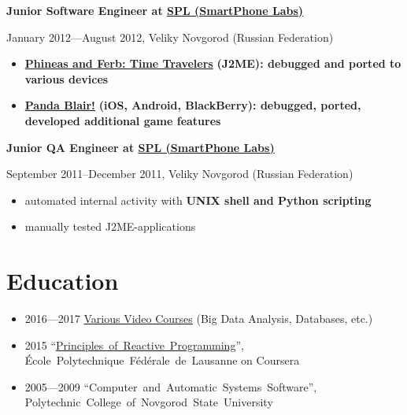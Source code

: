 \vspace{0.5cm}

{
\fontsize{12pt}{12pt}\selectfont
\bfseries Junior Software Engineer at
\href{http://spl.co}{\bfseries SPL (SmartPhone Labs)\mdseries}
\mdseries
}

{
\fontsize{9pt}{8pt}\selectfont
January 2012---August 2012, Veliky Novgorod (Russian Federation)
}

\begin{itemize}[rightmargin=\dimexpr\linewidth-18cm-\leftmargin\relax]
\item
    \href{http://java.mob.org/game/phineas\_and\_ferb\_time\_travelers.html}
        {\bfseries Phineas and Ferb: Time Travelers\mdseries}
        \bfseries (J2ME)\mdseries:
        debugged and ported to various devices
\item
    \href{https://itunes.apple.com/us/app/panda-blair!/id500995558?mt=8}
        {\bfseries Panda Blair!\mdseries}
        \bfseries (iOS, Android, BlackBerry)\mdseries: debugged, ported, developed additional game features
\end{itemize}

\vspace{0.5cm}

{
\fontsize{12pt}{12pt}\selectfont
\bfseries Junior QA Engineer at
\href{http://spl.co}{\bfseries SPL (SmartPhone Labs)\mdseries}
\mdseries
}

{
\fontsize{9pt}{8pt}\selectfont
September 2011--December 2011, Veliky Novgorod (Russian Federation)
}

\begin{itemize}[rightmargin=\dimexpr\linewidth-17cm-\leftmargin\relax]
    \item automated internal activity with \bfseries UNIX shell \mdseries and \bfseries Python \mdseries scripting
    \item manually tested J2ME-applications
\end{itemize}

\section*{Education}
\begin{itemize}
    \item 2016---2017 \href{https://alopatindev.github.io/2016/11/29/self-learning}{Various Video Courses} (Big Data Analysis, Databases, etc.)
    \item 2015 ``\href{https://www.coursera.org/account/accomplishments/verify/UJJ99REEZY}{Principles~of~Reactive~Programming}'', École~Polytechnique~Fédérale~de~Lausanne on Coursera
    \item 2005---2009 ``Computer~and~Automatic~Systems~Software'', Polytechnic~College~of~Novgorod~State~University
\end{itemize}

